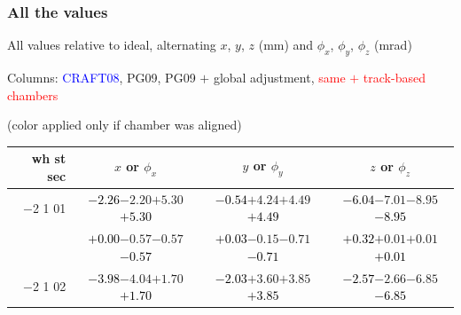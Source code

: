 \documentclass[compress]{beamer}
\begin{document}
\begin{frame}
\frametitle{All the values}
\tiny

All values relative to ideal, alternating $x$, $y$, $z$ (mm) and $\phi_x$, $\phi_y$, $\phi_z$ (mrad)

Columns: \textcolor{blue}{CRAFT08}, PG09, PG09 $+$ global adjustment, \textcolor{red}{same $+$ track-based chambers}

\hfill (color applied only if chamber was aligned)

\vfill
\renewcommand{\arraystretch}{1.1}
\begin{tabular}{r | c | c | c}
wh st sec & $x$ or $\phi_x$ & $y$ or $\phi_y$ & $z$ or $\phi_z$ \\\hline
$-$2 1 01 & \textcolor{black}{$-2.26$}\hspace{0.1 cm}$-2.20$\hspace{0.1 cm}$+5.30$\hspace{0.1 cm}\textcolor{black}{$+5.30$} & \textcolor{black}{$-0.54$}\hspace{0.1 cm}$+4.24$\hspace{0.1 cm}$+4.49$\hspace{0.1 cm}\textcolor{black}{$+4.49$} & \textcolor{black}{$-6.04$}\hspace{0.1 cm}$-7.01$\hspace{0.1 cm}$-8.95$\hspace{0.1 cm}\textcolor{black}{$-8.95$} \\
          & \textcolor{black}{$+0.00$}\hspace{0.1 cm}$-0.57$\hspace{0.1 cm}$-0.57$\hspace{0.1 cm}\textcolor{black}{$-0.57$} & \textcolor{black}{$+0.03$}\hspace{0.1 cm}$-0.15$\hspace{0.1 cm}$-0.71$\hspace{0.1 cm}\textcolor{black}{$-0.71$} & \textcolor{black}{$+0.32$}\hspace{0.1 cm}$+0.01$\hspace{0.1 cm}$+0.01$\hspace{0.1 cm}\textcolor{black}{$+0.01$} \\
$-$2 1 02 & \textcolor{black}{$-3.98$}\hspace{0.1 cm}$-4.04$\hspace{0.1 cm}$+1.70$\hspace{0.1 cm}\textcolor{black}{$+1.70$} & \textcolor{black}{$-2.03$}\hspace{0.1 cm}$+3.60$\hspace{0.1 cm}$+3.85$\hspace{0.1 cm}\textcolor{black}{$+3.85$} & \textcolor{black}{$-2.57$}\hspace{0.1 cm}$-2.66$\hspace{0.1 cm}$-6.85$\hspace{0.1 cm}\textcolor{black}{$-6.85$} \\

\end{tabular}
\end{frame}
\end{document}
